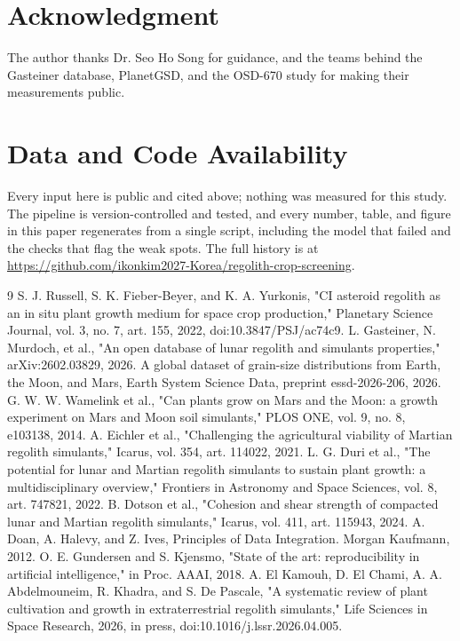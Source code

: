 \documentclass[conference,letterpaper,10pt]{IEEEtran}
\begin{document}
\section*{Acknowledgment}
The author thanks Dr. Seo Ho Song for guidance, and the teams behind the Gasteiner database, PlanetGSD, and the OSD-670 study for making their measurements public.

\section*{Data and Code Availability}
Every input here is public and cited above; nothing was measured for this study. The pipeline is version-controlled and tested, and every number, table, and figure in this paper regenerates from a single script, including the model that failed and the checks that flag the weak spots. The full history is at \url{https://github.com/ikonkim2027-Korea/regolith-crop-screening}.

\begin{thebibliography}{9}
 S. J. Russell, S. K. Fieber-Beyer, and K. A. Yurkonis, "CI asteroid regolith as an in situ plant growth medium for space crop production," Planetary Science Journal, vol. 3, no. 7, art. 155, 2022, doi:10.3847/PSJ/ac74c9.
 L. Gasteiner, N. Murdoch, et al., "An open database of lunar regolith and simulants properties," arXiv:2602.03829, 2026.
 A global dataset of grain-size distributions from Earth, the Moon, and Mars, Earth System Science Data, preprint essd-2026-206, 2026.
 G. W. W. Wamelink et al., "Can plants grow on Mars and the Moon: a growth experiment on Mars and Moon soil simulants," PLOS ONE, vol. 9, no. 8, e103138, 2014.
 A. Eichler et al., "Challenging the agricultural viability of Martian regolith simulants," Icarus, vol. 354, art. 114022, 2021.
 L. G. Duri et al., "The potential for lunar and Martian regolith simulants to sustain plant growth: a multidisciplinary overview," Frontiers in Astronomy and Space Sciences, vol. 8, art. 747821, 2022.
 B. Dotson et al., "Cohesion and shear strength of compacted lunar and Martian regolith simulants," Icarus, vol. 411, art. 115943, 2024.
 A. Doan, A. Halevy, and Z. Ives, Principles of Data Integration. Morgan Kaufmann, 2012.
 O. E. Gundersen and S. Kjensmo, "State of the art: reproducibility in artificial intelligence," in Proc. AAAI, 2018.
 A. El Kamouh, D. El Chami, A. A. Abdelmouneim, R. Khadra, and S. De Pascale, "A systematic review of plant cultivation and growth in extraterrestrial regolith simulants," Life Sciences in Space Research, 2026, in press, doi:10.1016/j.lssr.2026.04.005.
\end{thebibliography}
\end{document}
